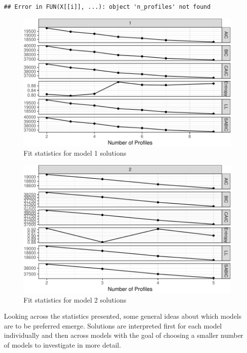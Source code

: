 \documentclass[]{book}
\theoremstyle{definition}
\theoremstyle{definition}
\theoremstyle{definition}
\theoremstyle{remark}
\begin{document}
\begin{verbatim}
## Error in FUN(X[[i]], ...): object 'n_profiles' not found
\end{verbatim}

\begin{figure}

{\centering \includegraphics[width=0.5\linewidth]{rosenberg-dissertation_files/figure-latex/model1-1} 

}

\caption{Fit statistics for model 1 solutions}\label{fig:model1}
\end{figure}

\begin{figure}

{\centering \includegraphics[width=0.4\linewidth]{rosenberg-dissertation_files/figure-latex/model2-1} 

}

\caption{Fit statistics for model 2 solutions}\label{fig:model2}
\end{figure}

Looking across the statistics presented, some general ideas about which
models are to be preferred emerge. Solutions are interpreted first for
each model individually and then across models with the goal of choosing
a smaller number of models to investigate in more detail.
\end{document}
